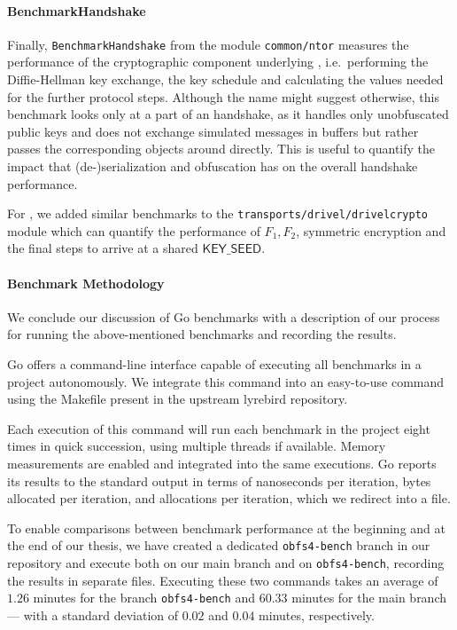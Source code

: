 \paragraph{BenchmarkHandshake}
Finally, \texttt{BenchmarkHandshake} from the module \texttt{common/ntor} measures the performance of the cryptographic component underlying \obfsfour{}, i.e.~performing the Diffie-Hellman key exchange, the key schedule and calculating the values needed for the further protocol steps.
Although the name might suggest otherwise, this benchmark looks only at a part of an \obfsfour{} handshake, as it handles only unobfuscated public keys and does not exchange simulated messages in buffers but rather passes the corresponding objects around directly. This is useful to quantify the impact that (de-)serialization and obfuscation has on the overall handshake performance.

For \drivel{}, we added similar benchmarks to the \texttt{transports/drivel/drivelcrypto} module which can quantify the performance of $F_1, F_2$, symmetric encryption and the final steps to arrive at a shared $\mathsf{KEY\_SEED}$.

\paragraph{Benchmark Methodology}
We conclude our discussion of Go benchmarks with a description of our process for running the above-mentioned benchmarks and recording the results.

Go offers a command-line interface capable of executing all benchmarks in a project autonomously. We integrate this command into an easy-to-use  command using the Makefile present in the upstream lyrebird repository.

Each execution of this command will run each benchmark in the project eight times in quick succession, using multiple threads if available. Memory measurements are enabled and integrated into the same executions. Go reports its results to the standard output in terms of nanoseconds per iteration, bytes allocated per iteration, and allocations per iteration, which we redirect into a file.

To enable comparisons between benchmark performance at the beginning and at the end of our thesis, we have created a dedicated \texttt{obfs4-bench} branch in our repository and execute  both on our main branch and on \texttt{obfs4-bench}, recording the results in separate files. Executing these two commands takes an average of $1.26$ minutes for the branch \texttt{obfs4-bench} and $60.33$ minutes for the main branch --- with a standard deviation of $0.02$ and $0.04$ minutes, respectively.


